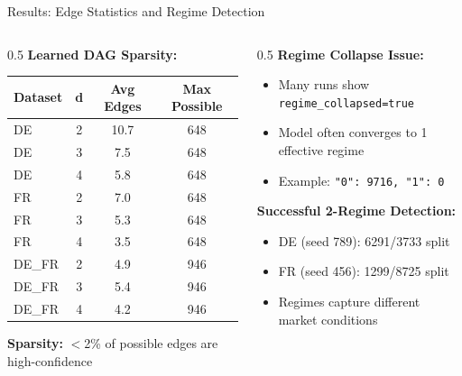 \documentclass[aspectratio=169]{beamer}
\begin{document}
\begin{frame}{Results: Edge Statistics and Regime Detection}
\begin{columns}
\begin{column}{0.5\textwidth}
\textbf{Learned DAG Sparsity:}
\begin{table}
\scriptsize
\begin{tabular}{l|c|cc}
\toprule
\textbf{Dataset} & \textbf{d} & \textbf{Avg Edges} & \textbf{Max Possible} \\
\midrule
DE & 2 & 10.7 & 648 \\
DE & 3 & 7.5 & 648 \\
DE & 4 & 5.8 & 648 \\
FR & 2 & 7.0 & 648 \\
FR & 3 & 5.3 & 648 \\
FR & 4 & 3.5 & 648 \\
DE\_FR & 2 & 4.9 & 946 \\
DE\_FR & 3 & 5.4 & 946 \\
DE\_FR & 4 & 4.2 & 946 \\
\bottomrule
\end{tabular}
\end{table}

\textbf{Sparsity:} $<$2\% of possible edges are high-confidence
\end{column}

\begin{column}{0.5\textwidth}
\textbf{Regime Collapse Issue:}
\begin{itemize}
    \item Many runs show \texttt{regime\_collapsed=true}
    \item Model often converges to 1 effective regime
    \item Example: \texttt{"0": 9716, "1": 0}
\end{itemize}

\vspace{0.3cm}
\textbf{Successful 2-Regime Detection:}
\begin{itemize}
    \item DE (seed 789): 6291/3733 split
    \item FR (seed 456): 1299/8725 split
    \item Regimes capture different market conditions
\end{itemize}
\end{column}
\end{columns}

\begin{center}
\end{center}
\end{frame}
\end{document}
